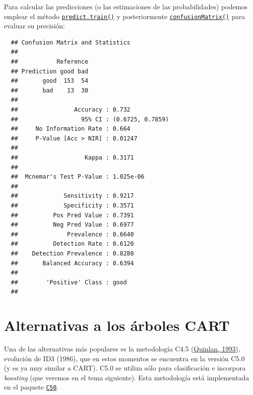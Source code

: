 \documentclass[
]{book}
\newenvironment{Shaded}{\begin{snugshade}}{\end{snugshade}}
\newcommand{\AttributeTok}[1]{\textcolor[rgb]{0.77,0.63,0.00}{#1}}
\newcommand{\CommentTok}[1]{\textcolor[rgb]{0.56,0.35,0.01}{\textit{#1}}}
\newcommand{\FunctionTok}[1]{\textcolor[rgb]{0.00,0.00,0.00}{#1}}
\newcommand{\NormalTok}[1]{#1}
\newcommand{\OtherTok}[1]{\textcolor[rgb]{0.56,0.35,0.01}{#1}}
\newcommand{\SpecialCharTok}[1]{\textcolor[rgb]{0.00,0.00,0.00}{#1}}
\theoremstyle{break}
\theoremstyle{nonumberplain}
\renewcommand{\CommentTok}[1]{\textcolor[rgb]{0.41,0.41,0.41}{\texttt{#1}}}
\begin{document}
Para calcular las predicciones (o las estimaciones de las probabilidades) podemos emplear el método \href{https://rdrr.io/pkg/caret/man/predict.train.html}{\texttt{predict.train()}} y posteriormente \href{https://rdrr.io/pkg/caret/man/confusionMatrix.html}{\texttt{confusionMatrix()}} para evaluar su precisión:

\begin{Shaded}
\end{Shaded}

\begin{verbatim}
  ## Confusion Matrix and Statistics
  ## 
  ##           Reference
  ## Prediction good bad
  ##       good  153  54
  ##       bad    13  30
  ##                                           
  ##                Accuracy : 0.732           
  ##                  95% CI : (0.6725, 0.7859)
  ##     No Information Rate : 0.664           
  ##     P-Value [Acc > NIR] : 0.01247         
  ##                                           
  ##                   Kappa : 0.3171          
  ##                                           
  ##  Mcnemar's Test P-Value : 1.025e-06       
  ##                                           
  ##             Sensitivity : 0.9217          
  ##             Specificity : 0.3571          
  ##          Pos Pred Value : 0.7391          
  ##          Neg Pred Value : 0.6977          
  ##              Prevalence : 0.6640          
  ##          Detection Rate : 0.6120          
  ##    Detection Prevalence : 0.8280          
  ##       Balanced Accuracy : 0.6394          
  ##                                           
  ##        'Positive' Class : good            
  ## 
\end{verbatim}

\hypertarget{alternativas-a-los-uxe1rboles-cart}{%
\section{Alternativas a los árboles CART}\label{alternativas-a-los-uxe1rboles-cart}}

Una de las alternativas más populares es la metodología C4.5 (\protect\hyperlink{ref-quinlan1993c4}{Quinlan, 1993}), evolución de ID3 (1986), que en estos momentos se encuentra en la versión C5.0 (y es ya muy similar a CART).
C5.0 se utiliza sólo para clasificación e incorpora \emph{boosting} (que veremos en el tema siguiente).
Esta metodología está implementada en el paquete \href{https://topepo.github.io/C5.0/index.html}{\texttt{C50}}.
\end{document}
